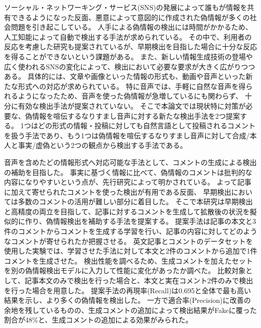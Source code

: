 ソーシャル・ネットワーキング・サービス(SNS)の発展によって誰もが情報を共有できるようになった反面、悪意によって意図的に作成された偽情報が多くの社会問題を引き起こしている。
人手による偽情報の検出には時間がかかるため、人工知能によって自動で検出する手法が求められている。
その中で、利用者の反応を考慮した研究も提案されているが、早期検出を目指した場合に十分な反応を得ることができないという課題がある。
また、新しい情報生成技術の登場や広く使われるSNSの変化によって、検出において必要な要求が大きく広がりつつある。
具体的には、文章や画像といった情報の形式も、動画や音声といった新たな形式への対応が求められている。
特に音声では、手軽に自然な音声を得られるようになったため、音声を使った偽情報が急増しているにも関わらず、
十分に有効な検出手法が提案されていない。
そこで本論文では現状特に対策が必要な、偽情報を喧伝するなりすまし音声に対する新たな検出手法を2つ提案する。
1つはどの形式の情報・投稿に対しても自然言語として投稿されるコメントを扱う手法であり、もう1つは偽情報を喧伝するなりすまし音声に対して合成/本人と事実/虚偽という2つの観点から検出する手法である。

音声を含めたどの情報形式へ対応可能な手法として、コメントの生成による検出の補助を目指した。
事実に基づく情報に比べて、偽情報のコメントは批判的な内容になりやすいという点が、先行研究によって明かされている。
よって記事に加えて寄せられたコメントを使った検出が有用である反面、
早期検出においては多数のコメントの活用が難しい部分に着目した。
そこで本研究は早期検出と高精度の両立を目指して、記事に対するコメントを生成して拡散後の状況を擬似的に作り、偽情報検出を補助する手法を提案する。
提案手法は記事の本文と3件のコメントからコメントを生成する学習を行い、記事の内容に対してどのようなコメントが寄せられたか把握させる。
英文記事とコメントのデータセットを使用した実験では、学習させた手法に対して本文と2件のコメントから追加で1件コメントを生成させた。
検出性能を調べるため、生成コメントを加えたセットを別の偽情報検出モデルに入力して性能に変化があったか調べた。
比較対象として、記事本文のみで検出を行った場合と、本文と実在コメント2件のみで検出を行った場合を用意した。
提案手法の再現率(Recall)は0.695と全体で最も高い結果を示し、より多くの偽情報を検出した。
一方で適合率(Precision)に改善の余地を残しているものの、生成コメントの追加によって検出結果がFakeに覆った割合が48\%と、生成コメントの追加による効果がみられた。

